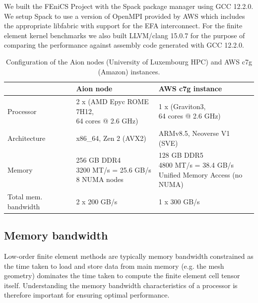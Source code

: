 We built the FEniCS Project with the Spack package manager using GCC 12.2.0. We
setup Spack to use a version of OpenMPI provided by AWS which includes the
appropriate libfabric with support for the EFA interconnect. For the finite
element kernel benchmarks we also built LLVM/clang 15.0.7 for the purpose of
comparing the performance against assembly code generated with GCC 12.2.0. 

\begin{table}
  \footnotesize
  \renewcommand{\arraystretch}{1.5}
  \begin{tabular}{l|l|l}
                              & Aion node                                                          & AWS c7g instance \\ \hline \hline
    Processor               & \makecell[l]{2 x (AMD Epyc ROME 7H12, \\ 64 cores @ 2.6 GHz)} & \makecell[l]{1 x (Graviton3, \\ 64 cores @ 2.6 GHz)} \\ \hline
      Architecture            & x86\_64, Zen 2 (AVX2)                                         & ARMv8.5, Neoverse V1 (SVE) \\ \hline
    Memory                  & \makecell[l]{256 GB DDR4 \\ 3200 MT/s = 25.6 GB/s \\ 8 NUMA nodes}            & \makecell[l]{128 GB DDR5 \\ 4800 MT/s = 38.4 GB/s \\ Unified Memory Access (no NUMA) } \\ \hline
      Total mem. bandwidth         & 2 x 200 GB/s                                                    & 1 x 300 GB/s \\ \hline
  \end{tabular}
  \vspace{5pt}
  \caption{Configuration of the Aion nodes (University of Luxembourg HPC) and AWS c7g (Amazon) instances.}
  \label{tab:aion-aws-config}
\end{table}


\subsection*{Memory bandwidth}

Low-order finite element methods are typically memory bandwidth constrained as
the time taken to load and store data from main memory (e.g. the mesh geometry)
dominates the time taken to compute the finite element cell tensor itself.
Understanding the memory bandwidth characteristics of a processor is therefore
important for ensuring optimal performance.

